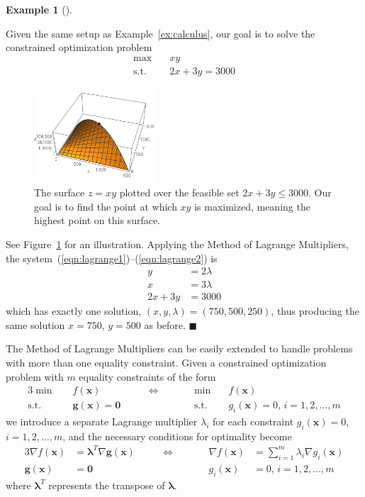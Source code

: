 \documentclass[11pt]{article}
\theoremstyle{definition} %
\newtheorem{ex}{Example}[section] %
\newenvironment{example}[1][]{\begin{ex}[#1]}{\hfill$\blacksquare$\end{ex}} %
\begin{document}
\begin{example}
\label{ex:calculusalt}
	
	Given the same setup as Example~\ref{ex:calculus}, our goal is to solve the constrained optimization problem
	\begin{align*}
		\max \quad& xy \\
		\mathrm{s.t.} \quad& 2x + 3y = 3000
	\end{align*}
	
	\begin{figure}[h]
		\centering
		\includegraphics[width=0.4\textwidth]{figures/constrainedopt02.png}
		\caption{The surface $z = xy$ plotted over the feasible set $2x + 3y \le 3000$. Our goal is to find the point at which $xy$ is maximized, meaning the highest point on this surface.}
		\label{fig:calculusalt}
	\end{figure}
	
	See Figure~\ref{fig:calculusalt} for an illustration. Applying the Method of Lagrange Multipliers, the system~\mbox{(\ref{eqn:lagrange1})--(\ref{eqn:lagrange2})} is
	\begin{align*}
		y &= 2 \lambda \\
		x &= 3 \lambda \\
		2x + 3y &= 3000
	\end{align*}
	which has exactly one solution, $(x,y,\lambda) = (750,500,250)$, thus producing the same solution $x = 750$, $y = 500$ as before.
\end{example}

The Method of Lagrange Multipliers can be easily extended to handle problems with more than one equality constraint. Given a constrained optimization problem with $m$ equality constraints of the form
\begin{alignat*}{3}
	\min \quad& f(\mathbf{x}) &\qquad \iff \qquad&& \min \quad& f(\mathbf{x}) \\
	\mathrm{s.t.} \quad& \mathbf{g}(\mathbf{x}) = \mathbf{0} &&& \mathrm{s.t.} \quad& g_i(\mathbf{x}) = 0, \, i=1,2,\dots,m
\end{alignat*}
we introduce a separate Lagrange multiplier $\lambda_i$ for each constraint $g_i(\mathbf{x}) = 0$, $i=1,2,\dots,m$, and the necessary conditions for optimality become
\begin{alignat}{3}
	\label{eqn:lagrange3} \nabla f(\mathbf{x}) &= \boldsymbol{\lambda}^T \nabla \mathbf{g}(\mathbf{x}) &\qquad \iff \qquad&& \nabla f(\mathbf{x}) &= \sum_{i=1}^m \lambda_i \nabla g_i(\mathbf{x}) \\
	\label{eqn:lagrange4} \mathbf{g}(\mathbf{x}) &= \mathbf{0} &&& g_i(\mathbf{x}) &= 0, \, i=1,2,\dots,m
\end{alignat}
where $\boldsymbol{\lambda}^T$ represents the transpose of $\boldsymbol{\lambda}$.
\end{document}
